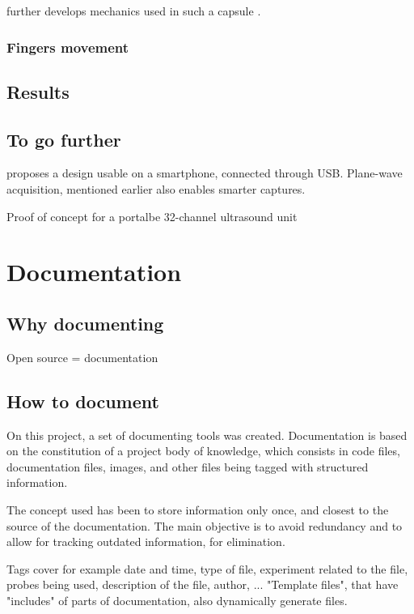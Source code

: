 \documentclass[conference]{IEEEtran}
\begin{document}
further develops mechanics used in such a capsule \cite{wang_development_2017}.

\subsubsection{Fingers movement}

\cite{sikdar_novel_2014}

\subsection{Results}


\subsection{To go further}

\cite{kim_smart-phone_2017} proposes a design usable on a smartphone, connected through USB. Plane-wave acquisition, mentioned earlier \cite{hewener_mobile_2015} also enables smarter captures.


 
Proof of concept for a portalbe 32-channel ultrasound unit \cite{kim_single_2012}

\section{Documentation}

\subsection{Why documenting}

Open source = documentation

\subsection{How to document}

On this project, a set of documenting tools was created. Documentation is based on the constitution of a project body of knowledge, which consists in code files, documentation files, images, and other files being tagged with structured information.

The concept used has been to store information only once, and closest to the source of the documentation. The main objective is to avoid redundancy and to allow for tracking outdated information, for elimination.

Tags cover for example date and time, type of file, experiment related to the file, probes being used, description of the file, author, ...  "Template files", that have "includes" of parts of documentation, also dynamically generate files.
\end{document}

